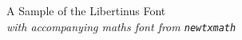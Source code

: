\documentclass[11pt]{article}
\begin{document}
{\LARGE \noindent A Sample of the Libertinus Font}\\

{\large \noindent \textit{with accompanying maths font from \texttt{newtxmath}}}\\[5pt]


\end{document}

